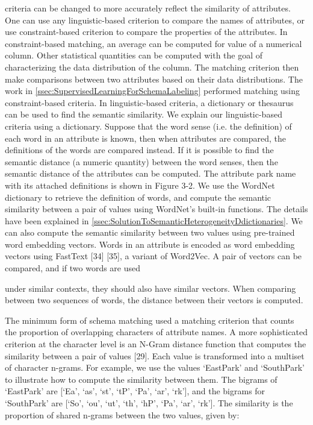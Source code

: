 criteria can be changed to more accurately reflect the similarity of attributes. One can use any linguistic-based criterion to compare the names of attributes, or use constraint-based criterion to compare the properties of the attributes. In constraint-based matching, an average can be computed for value of a numerical column. Other statistical quantities can be computed with the goal of characterizing the data distribution of the column. The matching criterion then make comparisons between two attributes based on their data distributions. The work in \autoref{ssec:SupervisedLearningForSchemaLabeling} performed matching using constraint-based criteria.
In linguistic-based criteria, a dictionary or thesaurus can be used to find the semantic similarity. We explain our linguistic-based criteria using a dictionary. Suppose that the word sense (i.e. the definition) of each word in an attribute is known, then when attributes are compared, the definitions of the words are compared instead. If it is possible to find the semantic distance (a numeric quantity) between the word senses, then the semantic distance of the attributes can be computed. The attribute park name with its attached definitions is shown in Figure 3-2.
We use the WordNet dictionary to retrieve the definition of words, and compute the semantic similarity between a pair of values using WordNet's built-in functions. The details have been explained in \autoref{ssec:SolutionToSemanticHeterogeneityDdictionaries}.
We can also compute the semantic similarity between two values using pre-trained word embedding vectors. Words in an attribute is encoded as word embedding vectors using FastText [34] [35], a variant of Word2Vec. A pair of vectors can be compared, and if two words are used

under similar contexts, they should also have similar vectors. When comparing between two sequences of words, the distance between their vectors is computed.

The minimum form of schema matching used a matching criterion that counts the proportion of overlapping characters of attribute names. A more sophisticated criterion at the character level is an N-Gram distance function that computes the similarity between a pair of values [29]. Each value is transformed into a multiset of character n-grams. For example, we use the values `EastPark' and `SouthPark' to illustrate how to compute the similarity between them. The bigrams of `EastPark' are [`Ea', `as', `st', `tP', `Pa', `ar', `rk'], and the bigrams for `SouthPark' are [`So', `ou', `ut', `th', `hP', `Pa', `ar', `rk']. The similarity is the proportion of shared n-grams between the two values, given by: 

